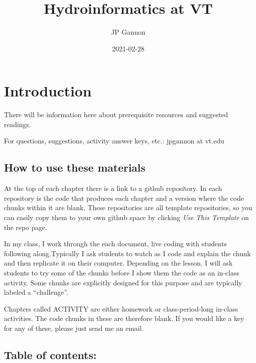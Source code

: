 \documentclass[
]{book}
\title{Hydroinformatics at VT}
\author{JP Gannon}
\date{2021-02-28}
\begin{document}
\maketitle

{
\setcounter{tocdepth}{1}
\tableofcontents
}
\hypertarget{introduction}{%
\chapter{Introduction}\label{introduction}}

There will be information here about prerequisite resources and suggested readings.

For questions, suggestions, activity answer keys, etc.: jpgannon at vt.edu

\hypertarget{how-to-use-these-materials}{%
\section{How to use these materials}\label{how-to-use-these-materials}}

At the top of each chapter there is a link to a github repository. In each repository is the code that produces each chapter and a version where the code chunks within it are blank. These repositories are all template repositories, so you can easily copy them to your own github space by clicking \emph{Use This Template} on the repo page.

In my class, I work through the each document, live coding with students following along.Typically I ask students to watch as I code and explain the chunk and then replicate it on their computer. Depending on the lesson, I will ask students to try some of the chunks before I show them the code as an in-class activity. Some chunks are explicitly designed for this purpose and are typically labeled a ``challenge''.

Chapters called ACTIVITY are either homework or class-period-long in-class activities. The code chunks in these are therefore blank. If you would like a key for any of these, please just send me an email.

\hypertarget{table-of-contents}{%
\section{Table of contents:}\label{table-of-contents}}
\end{document}
